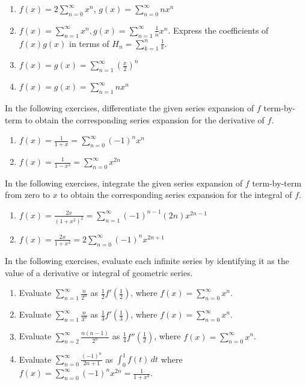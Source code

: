 \documentclass{exercises}
\begin{document}
\begin{enumerate}[resume]
\item $f(x)=2\sum_{n=0}^{\infty}x^{n}$, $g(x)=\sum_{n=0}^{\infty}nx^{n}$
\item $f(x)=\sum_{n=1}^{\infty}x^{n},g(x)=\sum_{n=1}^{\infty}\frac{1}{n}x^{n}$. Express the coefficients of $f(x)g(x)$ in terms of $H_{n}=\sum_{k=1}^{n}\frac{1}{k}$.
\item $f(x)=g(x)=\sum_{n=1}^{\infty}{(\frac{x}{2})}^{n}$
\item $f(x)=g(x)=\sum_{n=1}^{\infty}nx^{n}$
\end{enumerate}

In the following exercises, differentiate the given series expansion of $f$ term-by-term to obtain the corresponding series expansion for the derivative of $f$.

\begin{enumerate}[resume]
\item $f(x)=\frac{1}{1+x}=\sum_{n=0}^{\infty}{(-1)}^{n}x^{n}$
\item $f(x)=\frac{1}{1-x^{2}}=\sum_{n=0}^{\infty}x^{2n}$
\end{enumerate}

In the following exercises, integrate the given series expansion of $f$ term-by-term from zero to $x$ to obtain the corresponding series expansion for the integral of $f$.

\begin{enumerate}[resume]
\item $f(x)=\frac{2x}{{(1+x^{2})}^{2}}=\sum_{n=1}^{\infty}{(-1)}^{n-1}(2n)x^{2n-1}$
\item $f(x)=\frac{2x}{1+x^{2}}=2\sum_{n=0}^{\infty}{(-1)}^{n}x^{2n+1}$
\end{enumerate}

In the following exercises, evaluate each infinite series by identifying it as the value of a derivative or integral of geometric series.

\begin{enumerate}[resume]
\item Evaluate $\sum_{n=1}^{\infty}\frac{n}{2^{n}}$ as $\frac{1}{2}f'(\frac{1}{2})$, where $f(x)=\sum_{n=0}^{\infty}x^{n}$.
\item Evaluate $\sum_{n=1}^{\infty}\frac{n}{3^{n}}$ as $\frac{1}{3}f'(\frac{1}{3})$, where $f(x)=\sum_{n=0}^{\infty}x^{n}$.
\item Evaluate $\sum_{n=2}^{\infty}\frac{n(n-1)}{2^{n}}$ as $\frac{1}{4}f''(\frac{1}{2})$, where $f(x)=\sum_{n=0}^{\infty}x^{n}$.
\item Evaluate $\sum_{n=0}^{\infty}\frac{{(-1)}^{n}}{2n+1}$ as $\int_{0}^{1}f(t)\,dt$ where $f(x)=\sum_{n=0}^{\infty}{(-1)}^{n}x^{2n}=\frac{1}{1+x^{2}}$.
\end{enumerate}
\end{document}
